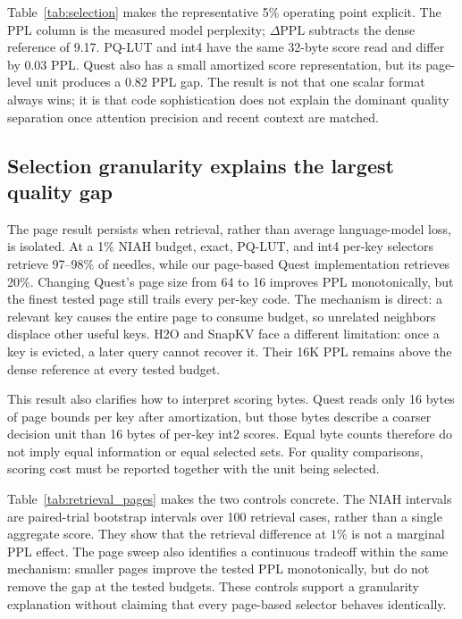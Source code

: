 \documentclass[sigplan,anonymous,review,nonacm]{acmart}
\begin{document}
Table~\ref{tab:selection} makes the representative 5\% operating point explicit.
The PPL column is the measured model perplexity; $\Delta$PPL subtracts the dense
reference of 9.17. PQ-LUT and int4 have the same 32-byte score read and differ by
0.03 PPL. Quest also has a small amortized score representation, but its page-level
unit produces a 0.82 PPL gap. The result is not that one scalar format always wins;
it is that code sophistication does not explain the dominant quality separation once
attention precision and recent context are matched.

\begin{table}[t]
\centering\small\setlength{\tabcolsep}{8pt}
\caption{Representative selection operating point at a 5\% budget
(Qwen2.5-0.5B, 16K context, dense PPL 9.17). ``Score representation'' is what the
selector scans for every historical key; ``selection unit'' states whether it ranks
individual keys, pages, or performs eviction. Lower PPL and $\Delta$PPL are better.}
\label{tab:selection}

\end{table}

\subsection{Selection granularity explains the largest quality gap}
The page result persists when retrieval, rather than average language-model loss, is
isolated. At a 1\% NIAH budget, exact, PQ-LUT, and int4 per-key selectors retrieve
97--98\% of needles, while our page-based Quest implementation retrieves 20\%.
Changing Quest's page size from 64 to 16 improves PPL monotonically, but the finest
tested page still trails every per-key code. The mechanism is direct: a relevant key
causes the entire page to consume budget, so unrelated neighbors displace other useful
keys. H2O and SnapKV face a different limitation: once a key is evicted, a later query
cannot recover it. Their 16K PPL remains above the dense reference at every tested
budget.

This result also clarifies how to interpret scoring bytes. Quest reads only 16 bytes
of page bounds per key after amortization, but those bytes describe a coarser decision
unit than 16 bytes of per-key int2 scores. Equal byte counts therefore do not imply
equal information or equal selected sets. For quality comparisons, scoring cost must
be reported together with the unit being selected.

Table~\ref{tab:retrieval_pages} makes the two controls concrete. The NIAH intervals
are paired-trial bootstrap intervals over 100 retrieval cases, rather than a single
aggregate score. They show that the retrieval difference at $1\%$ is not a marginal
PPL effect. The page sweep also identifies a continuous tradeoff within the same
mechanism: smaller pages improve the tested PPL monotonically, but do not remove the
gap at the tested budgets. These controls support a granularity explanation without
claiming that every page-based selector behaves identically.
\end{document}
